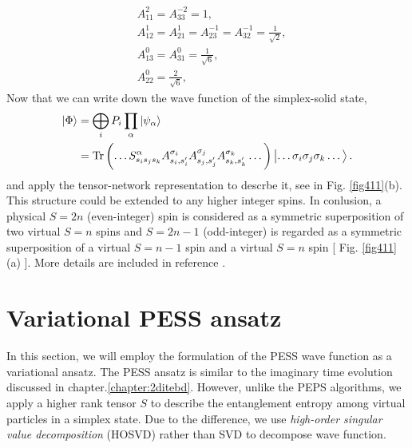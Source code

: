 \[
	\begin{aligned}
		&A_{11}^2 = A_{33}^{-2} = 1, \\
		&A_{12}^1 = A_{21}^{1} = A_{23}^{-1} = A_{32}^{-1} = \frac{1}{\sqrt{2}}, \\
		&A_{13}^0 = A_{31}^{0} = \frac{1}{\sqrt{6}}, \\
		&A_{22}^0 = \frac{2}{\sqrt{6}},
	\end{aligned}
\]
Now that we can write down the wave function of the simplex-solid state,
\begin{align}
	\Ket{\Phi} &= \bigoplus_i P_i \prod_{\alpha}{\Ket{\psi_{\alpha}}} \\
	&= \operatorname{Tr} \left( \dots S_{s_i s_j s_k}^{\alpha} A^{\sigma_i}_{s_i,s_i^{\prime}} A^{\sigma_j}_{s_j,s_j^{\prime}} A^{\sigma_k}_{s_k,s_k^{\prime}} \dots \right) \Ket{\dots \sigma_i \sigma_j \sigma_k \dots}.
\end{align}
and apply the tensor-network representation to descrbe it, see in Fig. \ref{fig411}(b).
This structure could be extended to any higher integer spins. In conlusion, a physical $S=2n$ (even-integer) spin is considered as a symmetric superposition of two virtual $S=n$ spins and $S=2n-1$ (odd-integer) is regarded as a symmetric superposition of a virtual $S=n-1$ spin and a virtual $S=n$ spin [ Fig. \ref{fig411}(a) ]. More details are included in reference \cite{} \cite{}.
\section{Variational PESS ansatz}
In this section, we will employ the formulation of the PESS wave function as a variational ansatz. The PESS ansatz is similar to the imaginary time evolution discussed in chapter.\ref{chapter:2ditebd}. However, unlike the PEPS algorithms, we apply a higher rank tensor $S$ to describe the entanglement entropy among virtual particles in a simplex state. Due to the difference, we use \textit{high-order singular value decomposition} (HOSVD) rather than SVD to decompose wave function.
